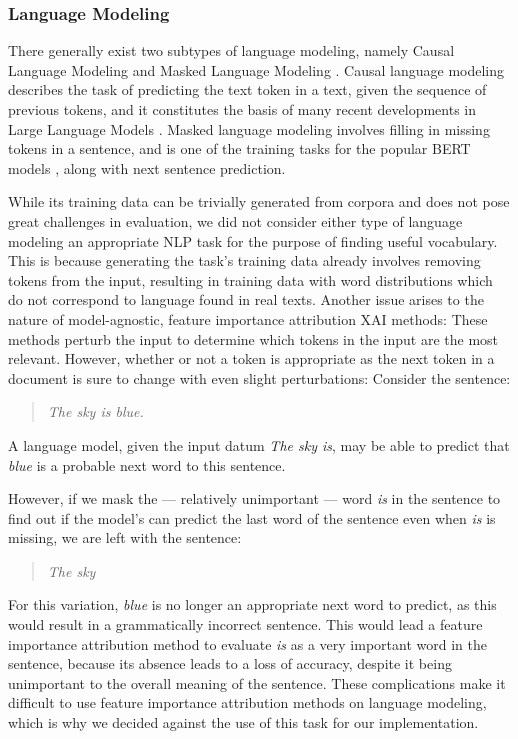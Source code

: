 \subsubsection{Language Modeling}
There generally exist two subtypes of language modeling, namely Causal Language Modeling and Masked Language Modeling \cite{jurafskySpeechLanguageProcessing2025a}.
Causal language modeling describes the task of predicting the text token in a text, given the sequence of previous tokens, and it constitutes the basis of many recent developments in Large Language Models \cite{brownLanguageModelsAre2020} \cite{openaiGPT4TechnicalReport2024}.
Masked language modeling involves filling in missing tokens in a sentence, and is one of the training tasks for the popular BERT models \cite{kentonBertPretrainingDeep2019}, along with next sentence prediction.

While its training data can be trivially generated from corpora and does not pose great challenges in evaluation, we did not consider either type of language modeling an appropriate NLP task for the purpose of finding useful vocabulary.
This is because generating the task's training data already involves removing tokens from the input, resulting in training data with word distributions which do not correspond to language found in real texts.
Another issue arises to the nature of model-agnostic, feature importance attribution XAI methods:
These methods perturb the input to determine which tokens in the input are the most relevant.
However, whether or not a token is appropriate as the next token in a document is sure to change with even slight perturbations:
Consider the sentence:

\begin{quote}
	\textit{The sky is blue.}
\end{quote}

A language model, given the input datum \textit{The sky is}, may be able to predict that \textit{blue} is a probable next word to this sentence.

However, if we mask the --- relatively unimportant --- word  \textit{is} in the sentence to find out if the model's can predict the last word of the sentence even when \textit{is} is missing, we are left with the sentence:

\begin{quote}
	\textit{The sky}
\end{quote}

For this variation, \textit{blue} is no longer an appropriate next word to predict, as this would result in a grammatically incorrect sentence.
This would lead a feature importance attribution method to evaluate \textit{is} as a very important word in the sentence, because its absence leads to a loss of accuracy, despite it being unimportant to the overall meaning of the sentence.
These complications make it difficult to use feature importance attribution methods on language modeling, which is why we decided against the use of this task for our implementation.


